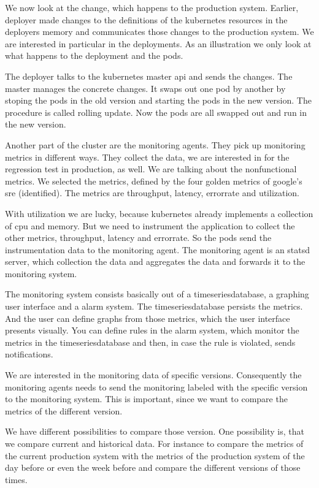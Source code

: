 We now look at the change, which happens to the production system. Earlier, deployer made
changes to the definitions of the kubernetes resources in the deployers memory and
communicates those changes to the production system. We are interested in particular in
the deployments. As an illustration we only look at what happens to the deployment and the
pods.

The deployer talks to the kubernetes master api and sends the changes. The master manages
the concrete changes. It swaps out one pod by another by stoping the pods in the old
version and starting the pods in the new version. The procedure is called rolling
update. Now the pods are all swapped out and run in the new version.

Another part of the cluster are the monitoring agents. They pick up monitoring metrics in
different ways. They collect the data, we are interested in for the regression test in
production, as well. We are talking about the nonfunctional metrics. We selected the
metrics, defined by the four golden metrics of google's sre (identified). The metrics are
throughput, latency, errorrate and utilization.

With utilization we are lucky, because kubernetes already implements a collection of cpu
and memory. But we need to instrument the application to collect the other metrics,
throughput, latency and errorrate. So the pods send the instrumentation data to the
monitoring agent. The monitoring agent is an statsd server, which collection the data and
aggregates the data and forwards it to the monitoring system.

The monitoring system consists basically out of a timeseriesdatabase, a graphing user
interface and a alarm system. The timeseriesdatabase persists the metrics. And the user
can define graphs from those metrics, which the user interface presents visually. You can
define rules in the alarm system, which monitor the metrics in the timeseriesdatabase and
then, in case the rule is violated, sends notifications.

We are interested in the monitoring data of specific versions. Consequently the monitoring
agents needs to send the monitoring labeled with the specific version to the monitoring
system. This is important, since we want to compare the metrics of the different version.

We have different possibilities to compare those version. One possibility is, that we
compare current and historical data. For instance to compare the metrics of the current
production system with the metrics of the production system of the day before or even the
week before and compare the different versions of those times.


